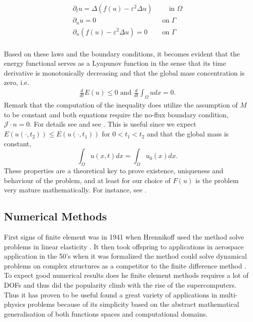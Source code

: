\begin{equation}
\label{eq:strongch}
    \begin{split}
\partial _{t} u  = \Delta ( f( u)  - \varepsilon ^2 \Delta u ) &\quad \text{ in } \Omega  \\
\partial _{n} u = 0 \quad &\text{ on } \Gamma  \\
\partial _{n}(f( u)  - \varepsilon ^2 \Delta u )  = 0 \quad &\text{ on } \Gamma  \\
    \end{split}
\end{equation}

Based on these laws and the boundary conditions, it becomes evident that the energy functional serves as a Lyapunov function in the sense that its time derivative is monotonically decreasing and that the global mass concentration is zero, i.e.
\[
    \begin{split}
\frac{d}{dt} E( u)  \le  0 \text{ and }\frac{d}{dt} \int_{\Omega }^{}  u dx = 0.
    \end{split}
\]
Remark that the computation of the inequality does utilize the assumption of $M$ to be constant and both equations require the no-flux boundary condition, $\mathcal{J} \cdot n = 0$.
For details see \cite[Equation 17 ]{lee2014physical} and see \cite[Equation 1.7]{garcke2020weak}.
This is useful since we expect $E( u( \cdot , t_{2}) ) \le  E( u( \cdot , t_{1}) ) $ for $0 < t_{1} < t_{2} $ and that the global mass is constant, \[
\int_{\Omega }^{} u ( x,t)  dx = \int_{\Omega }^{} u_{0}(x)  dx.
\]
These properties are a theoretical key to prove existence, uniqueness and behaviour of the problem, and at least for our choice of $F( u) $ is the problem very mature mathematically. For instance, see \cite{abels2007convergence, cherfils2011cahn,
elliott1986cahn}.

\subsection{Numerical Methods}%
\label{sub:numerical_methods}


First signs of finite element was in 1941 when Hrennikoff used the method solve problems in linear elasticity \cite{hrennikoff1941solution}. It then took offspring to applications in aerospace application in the 50's when it was formalized the method
could solve dynamical problems on complex structures as a competitor to the finite difference method
\cite{argyris1960energy, turner1956stiffness, liu2022eighty}. To expect good numerical results does he finite element methods requires a lot of DOFs and thus did the popularity climb with the rise of the supercomputers. Thus it has proven to be
useful found a great variety of applications in multi-physics problems because of its simplicity based on the abstract mathematical generalisation of both functions spaces and computational domains.

